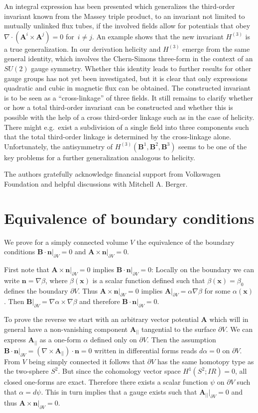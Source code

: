 \documentclass[10pt]{iopart}
\def \reals{I\!\!R}
\def \p{{\partial}}
\def \bA{{\mathbf{A}}}
\def \bB{{\mathbf{B}}}
\def \bx{{\mathbf{x}}}
\def \bn{{\mathbf{n}}}
\begin{document}
An integral expression has been presented which 
generalizes the third-order invariant
known from the Massey triple product,
to an invariant not limited to mutually unlinked flux tubes,
if the involved fields allow for potentials that obey 
$\nabla\cdot\left(\bA^i\times\bA^j\right)=0$ for~$i\ne j$.
An example shows that the new invariant $H^{(3)}$
is a true generalization.
In our derivation helicity and $H^{(3)}$ emerge from the
same general identity, which involves the Chern-Simons three-form
in the context of an $SU(2)$ gauge symmetry.
Whether this identity leads to further results for other gauge groups 
has not yet been investigated, but it is clear that only expressions
quadratic and cubic in magnetic flux can be obtained.
The constructed invariant is to be seen as 
a ``cross-linkage'' of three fields.
It still remains to clarify whether or how a total third-order invariant 
can be constructed and whether this is possible with 
the help of a cross third-order linkage such as in the case of
helicity.
There might e.g.~exist a subdivision of a single field
into three components such that the total third-order linkage is
determined by the cross-linkage alone.  
Unfortunately, the antisymmetry of
$H^{(3)}(\bB^1,\bB^2,\bB^3)$ seems to
be one of the key problems for a further generalization analogous to
helicity.


\ack The authors gratefully acknowledge financial support from Volkswagen Foundation and  helpful discussions with Mitchell A. Berger.

\appendix
\section{Equivalence of boundary conditions}
\label{Equivboundaryconditions}
We prove for a simply connected volume $V$ the equivalence of the boundary conditions $\bB\cdot\bn|_{\p V}=0$ and $\bA\times\bn|_{\p V} = 0$.

First note that $\bA\times\bn|_{\p V} = 0$ implies $\bB\cdot\bn|_{\p V}=0$: Locally on the boundary we can write $\bn=\nabla \beta$, where $\beta(\bx)$ is a scalar function defined such that $\beta(\bx)= \beta_0$ defines the boundary $\partial V$.
Thus $\bA\times\bn|_{\p V}=0$ implies $\bA|_{\p V} = \alpha \nabla\beta$ for some $\alpha(\bx)$.
Then $\bB|_{\p V}=\nabla\alpha\times\nabla\beta$ and therefore
$\bB\cdot\bn|_{\p V}=0$.

To prove the reverse we start with an arbitrary vector potential $\bA$   
which will in general have a non-vanishing component $\bA_{||}$
tangential to the surface $\p V$.
We can express $\bA_{||}$ as a one-form $\alpha$ 
defined only on $\p V$.
Then the assumption 
$\bB\cdot\bn|_{\p V} = (\nabla\times\bA_{||})\cdot\bn = 0$ 
written in differential forms reads
$d\alpha=0$ on $\p V$.
From $V$ being simply connected it follows that 
$\p V$ has the same homotopy type as the two-sphere $S^2$.
But since the cohomology vector space $H^1(S^2;\reals)=0$,
all closed one-forms are exact.
Therefore there exists a scalar function $\psi$ on $\p V$ such that
$\alpha = d\psi$.
This in turn implies that a gauge exists such that
$\bA_{||}|_{\p V}=0$ and thus $\bA\times\bn|_{\p V}=0$.
\end{document}

